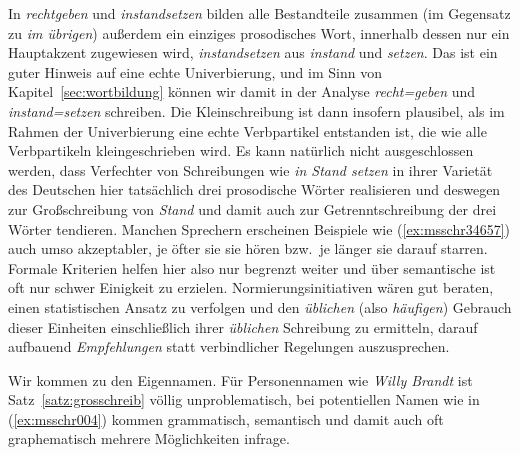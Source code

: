 In \textit{rechtgeben} und \textit{instandsetzen} bilden alle Bestandteile zusammen (im Gegensatz zu \textit{im übrigen}) außerdem ein einziges prosodisches Wort, innerhalb dessen nur ein Hauptakzent zugewiesen wird, \zB \textit{in\Akz standsetzen} aus \textit{in\Akz stand} und \textit{\Akz setzen}.
Das ist ein guter Hinweis auf eine echte Univerbierung, und im Sinn von Kapitel~\ref{sec:wortbildung} können wir damit in der Analyse \textit{recht=geben} und \textit{instand=setzen} schreiben.
Die Kleinschreibung ist dann insofern plausibel, als im Rahmen der Univerbierung eine echte Verbpartikel entstanden ist, die wie alle Verbpartikeln kleingeschrieben wird.
Es kann natürlich nicht ausgeschlossen werden, dass Verfechter von Schreibungen wie \textit{in Stand setzen} in ihrer Varietät des Deutschen hier tatsächlich drei prosodische Wörter realisieren und deswegen zur Großschreibung von \textit{Stand} und damit auch zur Getrenntschreibung der drei Wörter tendieren.
Manchen Sprechern erscheinen Beispiele wie (\ref{ex:msschr34657}) auch umso akzeptabler, je öfter sie sie hören bzw.\ je länger sie darauf starren.
Formale Kriterien helfen hier also nur begrenzt weiter und über semantische ist oft nur schwer Einigkeit zu erzielen.
Normierungsinitiativen wären gut beraten, einen statistischen Ansatz zu verfolgen und den \textit{üblichen} (also \textit{häufigen}) Gebrauch dieser Einheiten einschließlich ihrer \textit{üblichen} Schreibung zu ermitteln, darauf aufbauend \textit{Empfehlungen} statt verbindlicher Regelungen auszusprechen.

Wir kommen zu den Eigennamen.
Für Personennamen wie \textit{Willy Brandt} ist Satz~\ref{satz:grosschreib} völlig unproblematisch, bei potentiellen Namen wie in (\ref{ex:msschr004}) kommen grammatisch, semantisch und damit auch oft graphematisch mehrere Möglichkeiten infrage.

\begin{exe}
  \ex\label{ex:msschr004} 
  \begin{xlist}
  \end{xlist}
\end{exe}

